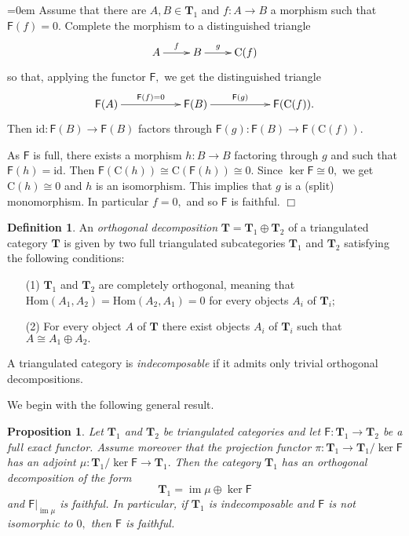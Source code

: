 \documentclass[a4paper,11pt,twoside]{amsart}
\newtheorem{prop}[thm]{Proposition}
\numberwithin{equation}{section}
\theoremstyle{definition}
\newtheorem{definition}[thm]{Definition}
\renewenvironment{proof}{\par\vspace{-5pt}\par\noindent\begingroup\leftskip=0em\hspace{0em}{\bf Proof.}}{\endgroup\hfill$\Box$}
\begin{document}
\begin{proof}
Assume that there are $A,B\in{{\mathbf{{T}}}}_1$ and $f:A\to B$ a morphism such that ${\mathsf{{F}}}(f)=0.$ Complete the morphism to a distinguished triangle
\[
\xymatrix{
A\ar[r]^-{f}& B\ar[r]^-{g}&{\mathrm{C}({f})}
}
\]
so that, applying the functor ${\mathsf{{F}}},$ we get the distinguished triangle
\[
\xymatrix{
{\mathsf{{F}}}(A)\ar[rr]^-{{\mathsf{{F}}}(f)=0}&&{\mathsf{{F}}}(B)\ar[rr]^-{{\mathsf{{F}}}(g)}&&{\mathsf{{F}}}({\mathrm{C}({f})}).
}
\]
Then ${\mathrm{id}}:{\mathsf{{F}}}(B)\to{\mathsf{{F}}}(B)$ factors through ${\mathsf{{F}}}(g)\colon{\mathsf{{F}}}(B)\to{\mathsf{{F}}}({\mathrm{C}({f})}).$

As ${\mathsf{{F}}}$ is full, there exists a morphism $h\colon B\to B$ factoring through $g$ and such that ${\mathsf{{F}}}(h)={\mathrm{id}}.$ Then ${\mathsf{{F}}}({\mathrm{C}({h})}){\cong}{\mathrm{C}({{\mathsf{{F}}}(h)})}{\cong} 0.$ Since $\ker{\mathsf{{F}}}{\cong} 0,$ we get ${\mathrm{C}({h})}{\cong} 0$ and $h$ is an isomorphism. This implies that $g$ is a (split) monomorphism. In particular $f=0,$ and so ${\mathsf{{F}}}$ is faithful.
\end{proof}

\begin{definition}
An {\em orthogonal decomposition} ${{\mathbf{{T}}}}={{\mathbf{{T}}}}_1{\oplus}{{\mathbf{{T}}}}_2$
of a triangulated category ${{\mathbf{{T}}}}$ is given by two full triangulated
subcategories ${{\mathbf{{T}}}}_1$ and ${{\mathbf{{T}}}}_2$ satisfying the following
conditions:
\begin{itemize}
\item[(1)] ${{\mathbf{{T}}}}_1$ and ${{\mathbf{{T}}}}_2$ are completely orthogonal, meaning that
${\mathrm{Hom}}(A_1,A_2)={\mathrm{Hom}}(A_2,A_1)=0$ for every objects $A_i$ of
${{\mathbf{{T}}}}_i;$
\item[(2)] For every object $A$ of ${{\mathbf{{T}}}}$ there exist objects $A_i$ of
${{\mathbf{{T}}}}_i$ such that $A{\cong} A_1\oplus A_2.$
\end{itemize}
A triangulated category is {\em indecomposable} if it admits only
trivial orthogonal decompositions.
\end{definition}

We begin with the following general result.

\begin{prop}\label{prop:gen1}
Let ${{\mathbf{{T}}}}_1$ and ${{\mathbf{{T}}}}_2$ be triangulated categories and let ${\mathsf{{F}}}:{{\mathbf{{T}}}}_1\to{{\mathbf{{T}}}}_2$ be a full exact functor. Assume moreover that the projection functor $\pi\colon{{\mathbf{{T}}}}_1\to{{\mathbf{{T}}}}_1/\ker{\mathsf{{F}}}$ has an adjoint $\mu\colon{{\mathbf{{T}}}}_1/\ker{\mathsf{{F}}}\to{{\mathbf{{T}}}}_1.$ Then the category ${{\mathbf{{T}}}}_1$ has an orthogonal decomposition of the form
\[
{{\mathbf{{T}}}}_1=\operatorname{im}\mu{\oplus}\ker{\mathsf{{F}}}
\]
and ${\mathsf{{F}}}{|_{{\operatorname{im}\mu}}}$ is faithful. In particular, if ${{\mathbf{{T}}}}_1$
is indecomposable and ${\mathsf{{F}}}$ is not isomorphic to $0,$ then ${\mathsf{{F}}}$
is faithful.
\end{prop}
\end{document}

